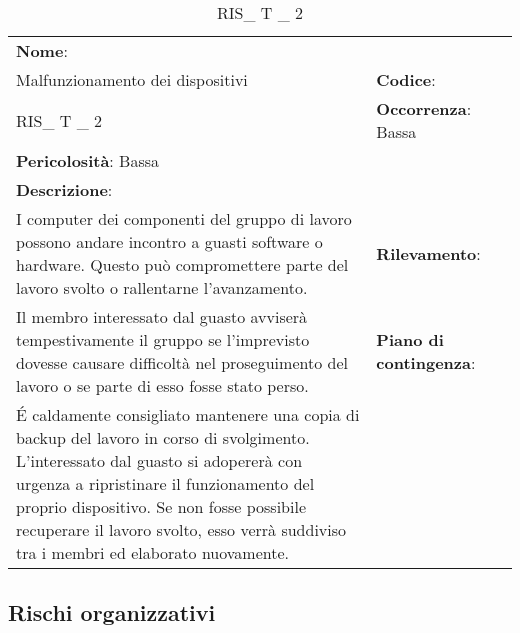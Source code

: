 \renewcommand{\arraystretch}{1.5}
\begin{longtable} { 
		>{\raggedright}p{} 
		>{\raggedright}p{} 
		>{\raggedright}p{}    }
	
	\caption{RIS\_ T \_ 2} \endhead	
	
	
	\textbf{Nome}: \\ Malfunzionamento dei dispositivi
	& \textbf{Codice}: \\ RIS\_ T \_ 2  
	& \textbf{Occorrenza}: Bassa \\ \textbf{Pericolosità}: Bassa
	
	\tabularnewline
	
	\textbf{Descrizione}: \\ I computer dei componenti del gruppo di lavoro possono andare incontro a guasti software o hardware. Questo può compromettere parte del lavoro svolto o rallentarne l'avanzamento.
	& 
	\textbf{Rilevamento}: \\ Il membro interessato dal guasto avviserà tempestivamente il gruppo se l'imprevisto dovesse causare difficoltà nel proseguimento del lavoro o se parte di esso fosse stato perso.
		
	&  
	\textbf{Piano di contingenza}: \\ \'E caldamente consigliato mantenere una copia di backup del lavoro in corso di svolgimento. L'interessato dal guasto si adopererà con urgenza a ripristinare il funzionamento del proprio dispositivo. Se non fosse possibile recuperare il lavoro svolto, esso verrà suddiviso tra i membri ed elaborato nuovamente.
	
\end{longtable}



\subsection{Rischi organizzativi}


